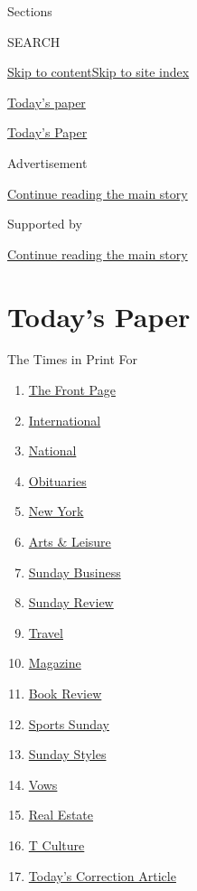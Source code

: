 Sections

SEARCH

\protect\hyperlink{site-content}{Skip to
content}\protect\hyperlink{site-index}{Skip to site index}

\href{https://www.nytimes3xbfgragh.onion/section/todayspaper}{Today's
paper}

\href{https://myaccount.nytimes3xbfgragh.onion/auth/login?response_type=cookie\&client_id=vi}{}

\href{https://www.nytimes3xbfgragh.onion/section/todayspaper}{Today's
Paper}

Advertisement

\protect\hyperlink{after-top}{Continue reading the main story}

Supported by

\protect\hyperlink{after-sponsor}{Continue reading the main story}

\hypertarget{todays-paper}{%
\section{Today's Paper}\label{todays-paper}}

The Times in Print For

\begin{enumerate}
\def\labelenumi{\arabic{enumi}.}
\tightlist
\item
  \protect\hyperlink{thefrontpage}{The Front Page}
\item
  \protect\hyperlink{international}{International}
\item
  \protect\hyperlink{national}{National}
\item
  \protect\hyperlink{obituaries}{Obituaries}
\item
  \protect\hyperlink{newyork}{New York}
\item
  \protect\hyperlink{artsux5cux26leisure}{Arts \& Leisure}
\item
  \protect\hyperlink{sundaybusiness}{Sunday Business}
\item
  \protect\hyperlink{sundayreview}{Sunday Review}
\item
  \protect\hyperlink{travel}{Travel}
\item
  \protect\hyperlink{magazine}{Magazine}
\item
  \protect\hyperlink{bookreview}{Book Review}
\item
  \protect\hyperlink{sportssunday}{Sports Sunday}
\item
  \protect\hyperlink{sundaystyles}{Sunday Styles}
\item
  \protect\hyperlink{vows}{Vows}
\item
  \protect\hyperlink{realestate}{Real Estate}
\item
  \protect\hyperlink{tculture}{T Culture}
\item
  \protect\hyperlink{todayux27scorrectionarticle}{Today's Correction
  Article}
\end{enumerate}

